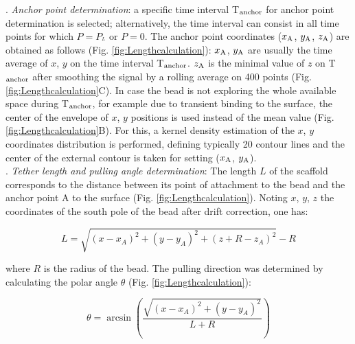 \documentclass{biophys-new}
\begin{document}
. \textit{ Anchor point determination}: a specific time interval T$_{\rm anchor}$ for anchor point determination is selected; alternatively, the time interval can consist in all time points for which $P=P_{^L}$ or $P=0$. The anchor point coordinates ($x_{\rm A}$, $y_{\rm A}$, $z_{\rm A}$) are obtained as follows (Fig. \ref{fig:Lengthcalculation}): $x_{\rm A}$, $y_{\rm A}$ are usually the time average of $x$, $y$ on the time interval T$_{\rm anchor}$. $z_{\rm A}$ is the minimal value of $z$ on T$_{\rm anchor}$ after smoothing the signal by a rolling average on 400 points (Fig. \ref{fig:Lengthcalculation}C). In case the bead is not exploring the whole available space during T$_{\rm anchor}$, for example due to transient binding to the surface, the center of the envelope of $x$, $y$ positions is used instead of the mean value (Fig. \ref{fig:Lengthcalculation}B). For this, a kernel density estimation of the $x$, $y$ coordinates distribution is performed, defining typically 20 contour lines and the center of the external contour is taken for setting ($x_{\rm A}$, $y_{\rm A}$).\\

. \textit{ Tether length and pulling angle determination}: The length $L$ of the scaffold corresponds to the distance between its point of attachment to the bead and the anchor point A to the surface (Fig. \ref{fig:Lengthcalculation}). Noting $x$, $y$, $z$ the coordinates of the south pole of the bead after drift correction, one has:

\begin{equation}
\label{eq:Length}
L = \sqrt{(x - x_A)^2+(y-y_A)^2+(z+R-z_A)^2}-R
\end{equation}


where $R$ is the radius of the bead. The pulling direction was determined by calculating the polar angle $\theta$ (Fig. \ref{fig:Lengthcalculation}):

\begin{equation}
\label{eq:AngleTheta}
\theta = \arcsin  \left( \dfrac{ \sqrt{(x - x_A)^2 + (y-y_A)^2 }} { L + R } \right)
\end{equation}
\end{document}
